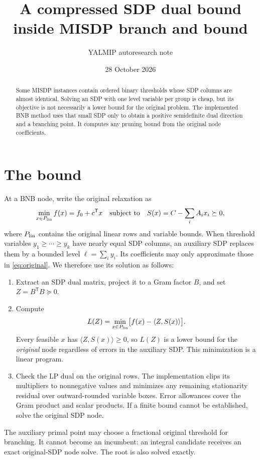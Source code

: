 \documentclass[10pt,a4paper]{article}
\title{A compressed SDP dual bound inside MISDP branch and bound}
\author{YALMIP autoresearch note}
\date{28 October 2026}
\newcommand{\ip}[2]{\langle #1,#2\rangle}
\begin{document}
\maketitle

\begin{abstract}
Some MISDP instances contain ordered binary thresholds whose SDP columns
are almost identical.  Solving an SDP with one level variable per group is
cheap, but its objective is not necessarily a lower bound for the original
problem.  The implemented BNB method uses that small SDP only to obtain a
positive semidefinite dual direction and a branching point.  It computes
any pruning bound from the original node coefficients.
\end{abstract}

\section*{The bound}
At a BNB node, write the original relaxation as
\begin{equation}
 \min_{x\in P_{\rm lin}} f(x)=f_0+c^\mathsf{T}x
 \quad\text{subject to}\quad
 S(x)=C-\sum_i A_i x_i\succeq0,                 \label{eq:original}
\end{equation}
where $P_{\rm lin}$ contains the original linear rows and variable bounds.
When threshold variables $y_1\geq\cdots\geq y_k$ have nearly equal SDP
columns, an auxiliary SDP replaces them by a bounded level
$\ell=\sum_i y_i$.  Its coefficients may only approximate those in
\eqref{eq:original}.  We therefore use its solution as follows:
\begin{enumerate}
 \item Extract an SDP dual matrix, project it to a Gram factor $B$, and
       set $Z=B^\mathsf{T}B\succeq0$.
 \item Compute
       \begin{equation}
       L(Z)=\min_{x\in P_{\rm lin}}
          \bigl[f(x)-\ip{Z}{S(x)}\bigr].       \label{eq:bound}
       \end{equation}
       Every feasible $x$ has $\ip{Z}{S(x)}\geq0$, so $L(Z)$ is a
       lower bound for the \emph{original} node regardless of errors in
       the auxiliary SDP.  This minimization is a linear program.
 \item Check the LP dual on the original rows.  The implementation clips
       its multipliers to nonnegative values and minimizes any remaining
       stationarity residual over outward-rounded variable boxes.  Error
       allowances cover the Gram product and scalar products.  If a
       finite bound cannot be established, solve the original SDP node.
\end{enumerate}
The auxiliary primal point may choose a fractional original threshold for
branching.  It cannot become an incumbent: an integral candidate receives
an exact original-SDP node solve.  The root is also solved exactly.
\end{document}
